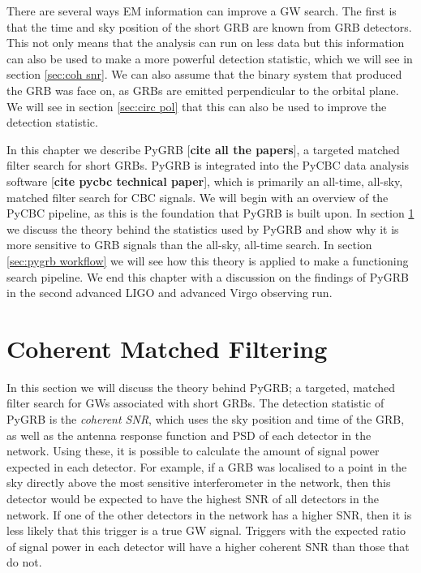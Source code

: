 \documentclass[11pt]{cuthesis}
\begin{document}
There are several ways EM information can improve a GW search. The first is that the time and sky position of the short GRB are known from GRB detectors. This not only means that the analysis can run on less data but this information can also be used to make a more powerful detection statistic, which we will see in section \ref{sec:coh snr}. We can also assume that the binary system that produced the GRB was face on, as GRBs are emitted perpendicular to the orbital plane. We will see in section \ref{sec:circ pol} that this can also be used to improve the detection statistic.  

In this chapter we describe PyGRB [\textbf{cite all the papers}], a targeted matched filter search for short GRBs. PyGRB is integrated into the PyCBC data analysis software [\textbf{cite pycbc technical paper}], which is primarily an all-time, all-sky, matched filter search for CBC signals. We will begin with an overview of the PyCBC pipeline, as this is the foundation that PyGRB is built upon. In section \ref{sec:PyGRB} we discuss the theory behind the statistics used by PyGRB and show why it is more sensitive to GRB signals than the all-sky, all-time search. In section \ref{sec:pygrb workflow} we will see how this theory is applied to make a functioning search pipeline. We end this chapter with a discussion on the findings of PyGRB in the second advanced LIGO and advanced Virgo observing run.


\section{Coherent Matched Filtering} \label{sec:PyGRB}
In this section we will discuss the theory behind PyGRB; a targeted, matched filter search for GWs associated with short GRBs. The detection statistic of PyGRB is the \textit{coherent SNR}, which uses the sky position and time of the GRB, as well as the antenna response function and PSD of each detector in the network. Using these, it is possible to calculate the amount of signal power expected in each detector. For example, if a GRB was localised to a point in the sky directly above the most sensitive interferometer in the network, then this detector would be expected to have the highest SNR of all detectors in the network. If one of the other detectors in the network has a higher SNR, then it is less likely that this trigger is a true GW signal. Triggers with the expected ratio of signal power in each detector will have a higher coherent SNR than those that do not. 
\end{document}
